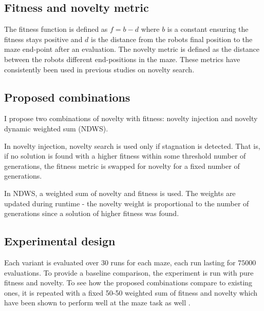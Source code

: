 \subsection{Fitness and novelty metric}
The fitness function is defined as $f = b - d$ where $b$ is a constant ensuring the fitness stays positive
and $d$ is the distance from the robots final position to the maze end-point after an evaluation.
The novelty metric is defined as the distance between the robots different end-positions in the maze.
These metrics have consistently been used in previous studies on novelty search.

\subsection{Proposed combinations}
I propose two combinations of novelty with fitness: novelty injection and novelty dynamic weighted sum (NDWS).

In novelty injection, novelty search is used only if stagnation is detected. That is, if no solution is found with a
higher fitness within some threshold number of generations, the fitness metric is swapped for novelty for a fixed
number of generations.

In NDWS, a weighted sum of novelty and fitness is used. The weights are updated during runtime - the novelty
weight is proportional to the number of generations since a solution of higher fitness was found.

\subsection{Experimental design}
Each variant is evaluated over $30$ runs for each maze, each run lasting for $75 000$ evaluations.
To provide a baseline comparison, the experiment is run with pure fitness and novelty. To see how
the proposed combinations compare to existing ones, it is repeated with a fixed 50-50 weighted sum
of fitness and novelty which have been shown to perform well at the maze task as well \cite{ns_study}.
